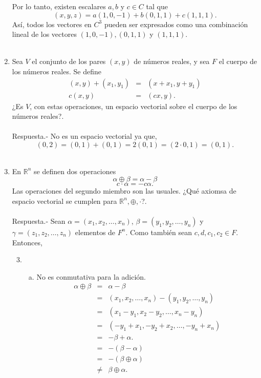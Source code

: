 \begin{enumerate}[\bfseries 1.]
	Por lo tanto, existen escalares $a,b$ y $c\in C$ tal que 
	$$(x,y,z)=a(1,0,-1)+b(0,1,1)+c(1,1,1).$$
	Así, todos los vectores en $C^3$ pueden ser expresados como una combinación lineal de los vectores $(1,0,-1),(0,1,1)$ y $(1,1,1)$.\\\\

    \item Sea $V$ el conjunto de los pares $(x,y)$ de números reales, y sea $F$ el cuerpo de los números reales. Se define
    $$
    \begin{array}{rcl}
	(x,y)+(x_1,y_1) &=& (x+x_1,y+y_1)\\
	c(x,y) &=& (cx,y).
    \end{array}
    $$
    ¿Es $V$, con estas operaciones, un espacio vectorial sobre el cuerpo de los números reales?.\\\\
	Respuesta.-\; No es un espacio vectorial ya que, 
	$$(0,2)=(0,1)+(0,1)=2(0,1)=(2\cdot 0,1)=(0,1).$$\\

    \item En $\mathbb{R}^n$ se definen dos operaciones
    $$\alpha \oplus \beta = \alpha-\beta$$
    $$c\cdot \alpha=-c\alpha.$$
    Las operaciones del segundo miembro son las usuales. ¿Qué axiomsa de espacio vectorial se cumplen para $\mathbb{R}^n,\oplus,\cdot$?.\\\\
	Respuesta.-\; Sean $\alpha=(x_1,x_2,\ldots,x_n)$,  $\beta=(y_1,y_2,\ldots,y_n)$ y $\gamma=(z_1,z_2,\ldots,z_n)$ elementos de $F^n$. Como también sean $c,d,c_1,c_2\in F$. Entonces,
	\begin{enumerate}[(1)]
	    \setcounter{enumii}{2}
	    \item 
		\begin{enumerate}[(a)]
		    \item No es conmutativa para la adición. 
			$$
			\begin{array}{rcl}
			    \alpha\oplus \beta &=& \alpha-\beta\\
					       & = & (x_1,x_2,\ldots,x_n)-(y_1,y_2,\ldots, y_n) \\
							      &=& (x_1-y_1,x_2-y_2,\ldots,x_n-y_n)\\
							      &=& (-y_1+x_1,-y_2+x_2,\ldots,-y_n+x_n)\\
							      &=& -\beta+ \alpha.\\
							      &=& -(\beta-\alpha)\\
							      &=& -(\beta\oplus \alpha)\\
							      &\neq& \beta\oplus \alpha.
			\end{array}
			$$


\end{enumerate}
\end{enumerate}
\end{enumerate}

